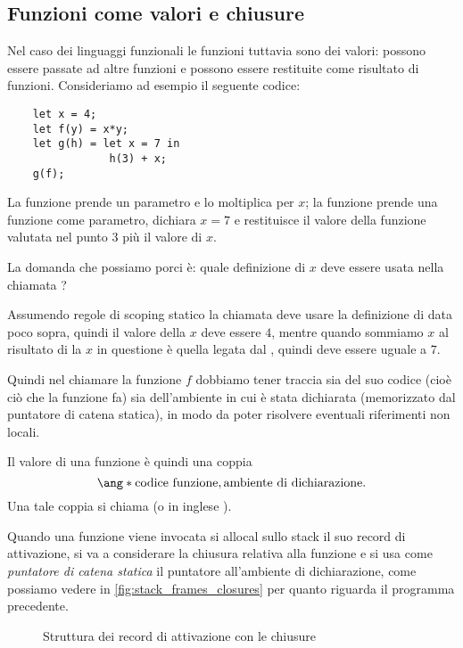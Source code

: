 \subsection*{Funzioni come valori e chiusure}

Nel caso dei linguaggi funzionali le funzioni tuttavia sono dei valori: possono essere passate ad altre funzioni e possono essere restituite come risultato di funzioni. Consideriamo ad esempio il seguente codice:
\begin{verbatim}
    let x = 4;
    let f(y) = x*y;
    let g(h) = let x = 7 in
                h(3) + x;
    g(f);
\end{verbatim}
La funzione  prende un parametro e lo moltiplica per $x$; la funzione  prende una funzione  come parametro, dichiara $x = 7$ e restituisce il valore della funzione  valutata nel punto $3$ più il valore di $x$.

La domanda che possiamo porci è: quale definizione di $x$ deve essere usata nella chiamata ?

Assumendo regole di scoping statico la chiamata  deve usare la definizione di  data poco sopra, quindi il valore della $x$ deve essere $4$, mentre quando sommiamo $x$ al risultato di  la $x$ in questione è quella legata dal , quindi deve essere uguale a $7$.

Quindi nel chiamare la funzione $f$ dobbiamo tener traccia sia del suo codice (cioè ciò che la funzione fa) sia dell'ambiente in cui è stata dichiarata (memorizzato dal puntatore di catena statica), in modo da poter risolvere eventuali riferimenti non locali.

Il valore di una funzione è quindi una coppia \[
    \ang*{\text{codice funzione}, \text{ambiente di dichiarazione}}.    
\] Una tale coppia si chiama  (o in inglese ).

Quando una funzione viene invocata si allocal sullo stack il suo record di attivazione, si va a considerare la chiusura relativa alla funzione e si usa come \emph{puntatore di catena statica} il puntatore all'ambiente di dichiarazione, come possiamo vedere in \autoref{fig:stack_frames_closures} per quanto riguarda il programma precedente.

\begin{figure}
    \centering
    
    
    \caption{Struttura dei record di attivazione con le chiusure}
    \label{fig:stack_frames_closures}
\end{figure}

